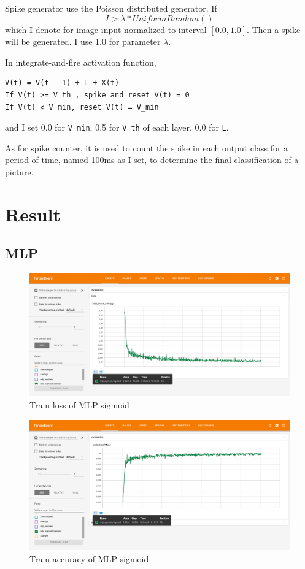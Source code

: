\documentclass[10pt,twocolumn,letterpaper]{article}
\begin{document}
\begin{CJK}{UTF8}{gbsn}
Spike generator use the Poisson distributed generator. If
\begin{equation}
I > \lambda * UniformRandom()
\end{equation}
which I denote for image input normalized to interval $[0.0, 1.0]$. Then a spike will be generated. I use 1.0 for parameter $\lambda$.

In integrate-and-fire activation function,
\begin{lstlisting}
V(t) = V(t - 1) + L + X(t)
If V(t) >= V_th , spike and reset V(t) = 0
If V(t) < V min, reset V(t) = V_min
\end{lstlisting}
and I set 0.0 for \texttt{V\_min}, 0.5 for \texttt{V\_th} of each layer, 0.0 for \texttt{L}.

As for spike counter, it is used to count the spike in each output class for a period of time, named 100ms as I set, to determine the final classification of a picture.

\section{Result}

\subsection{MLP}

\begin{figure}
\begin{center}
   \includegraphics[width=0.9\linewidth]{mlp_sigmoid2.png}
\end{center}
\caption{Train loss of MLP sigmoid}
\label{fig:mlp_sigmoid2}
\end{figure}

\begin{figure}
\begin{center}
   \includegraphics[width=0.9\linewidth]{mlp_sigmoid1.png}
\end{center}
\caption{Train accuracy of MLP sigmoid}
\label{fig:mlp_sigmoid1}
\end{figure}


\end{CJK}
\end{document}
